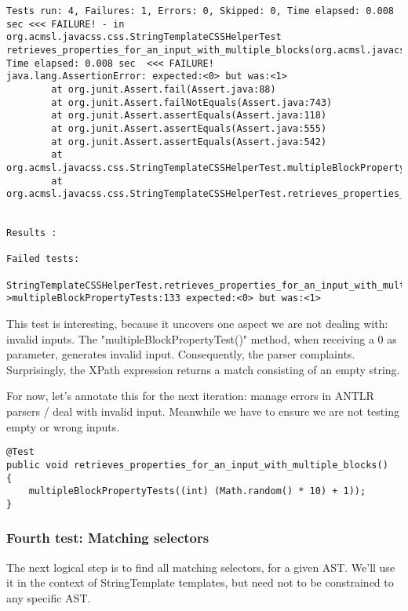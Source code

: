 \documentclass[11pt]{article}
\begin{document}
\begin{verbatim}
Tests run: 4, Failures: 1, Errors: 0, Skipped: 0, Time elapsed: 0.008 sec <<< FAILURE! - in org.acmsl.javacss.css.StringTemplateCSSHelperTest
retrieves_properties_for_an_input_with_multiple_blocks(org.acmsl.javacss.css.StringTemplateCSSHelperTest)  Time elapsed: 0.008 sec  <<< FAILURE!
java.lang.AssertionError: expected:<0> but was:<1>
        at org.junit.Assert.fail(Assert.java:88)
        at org.junit.Assert.failNotEquals(Assert.java:743)
        at org.junit.Assert.assertEquals(Assert.java:118)
        at org.junit.Assert.assertEquals(Assert.java:555)
        at org.junit.Assert.assertEquals(Assert.java:542)
        at org.acmsl.javacss.css.StringTemplateCSSHelperTest.multipleBlockPropertyTests(StringTemplateCSSHelperTest.java:133)
        at org.acmsl.javacss.css.StringTemplateCSSHelperTest.retrieves_properties_for_an_input_with_multiple_blocks(StringTemplateCSSHelperTest.java:158)


Results :

Failed tests:
  StringTemplateCSSHelperTest.retrieves_properties_for_an_input_with_multiple_blocks:158->multipleBlockPropertyTests:133 expected:<0> but was:<1>
\end{verbatim}

This test is interesting, because it uncovers one aspect we are not dealing with: invalid inputs. The "multipleBlockPropertyTest()" method, when receiving a 0 as parameter, generates
invalid input. Consequently, the parser complaints. Surprisingly, the XPath expression returns a match consisting of an empty string.

For now, let's annotate this for the next iteration: manage errors in ANTLR parsers / deal with invalid input. Meanwhile we have
to ensure we are not testing empty or wrong inputs.

\begin{verbatim}
@Test
public void retrieves_properties_for_an_input_with_multiple_blocks()
{
    multipleBlockPropertyTests((int) (Math.random() * 10) + 1));
}
\end{verbatim}

\subsubsection{Fourth test: Matching selectors}
\label{sec-1-4-5}

The next logical step is to find all matching selectors, for a given AST. We'll use it in the context of StringTemplate templates, but
need not to be constrained to any specific AST.
\end{document}
